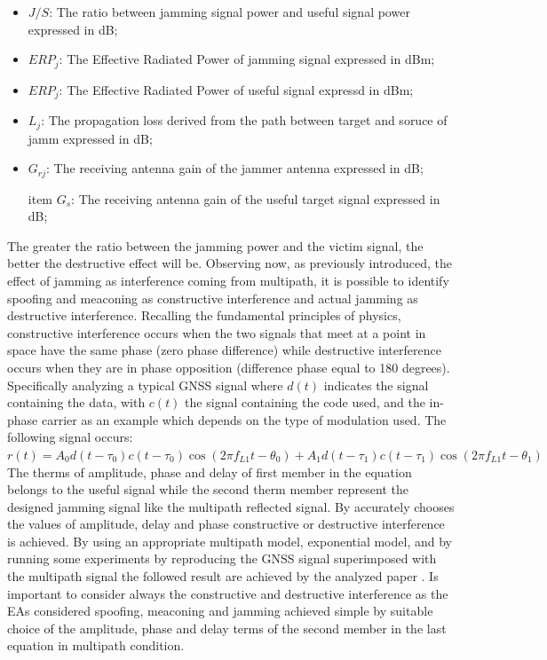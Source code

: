 \documentclass[12pt]{report}
\begin{document}
\begin{itemize}
     \item $J/S$: The ratio between jamming signal power and useful signal power expressed in dB;
         
    \item $ERP_{j}$: The Effective Radiated Power of jamming signal expressed in dBm;
        
    \item $ERP_{j}$: The Effective Radiated Power of useful signal expressd in dBm;
         
    \item $L_{j}$: The propagation loss derived from the path between target and soruce of jamm expressed in dB;
        
    \item $G_{rj}$: The receiving antenna gain of the jammer antenna expressed in dB;
           
    item $G_{s}$:  The receiving antenna gain of the useful target signal expressed in dB;
               
\end{itemize}
The greater the ratio between the jamming power and the victim signal, the better the destructive effect will be. Observing now, as previously introduced, the effect of jamming as interference coming from multipath, it is possible to identify spoofing and meaconing as constructive interference and actual jamming as destructive interference. Recalling the fundamental principles of physics, constructive interference occurs when the two signals that meet at a point in space have the same phase (zero phase difference) while destructive interference occurs when they are in phase opposition (difference phase equal to 180 degrees). Specifically analyzing a typical GNSS signal where $d(t)$ indicates the signal containing the data, with $c(t)$ the signal containing the code used, and the in-phase carrier as an example which depends on the type of modulation used. The following signal occurs: \newline \newline
$r(t) = A_{0} d(t - \tau_{0}) c(t - \tau_{0}) \cos({2\pi f_{L1}t - \theta_{0}}) + A_{1} d(t - \tau_{1}) c(t - \tau_{1}) \cos({2\pi f_{L1}t - \theta_{1}})$ \newline \newline
The therms of amplitude, phase and delay of first member in the equation belongs to the useful signal while the second therm member represent the designed jamming signal like the multipath reflected signal. By accurately chooses the values of amplitude, delay and phase constructive or destructive interference is achieved. By using an appropriate multipath model, exponential model, and by running some experiments by reproducing the GNSS signal superimposed with the multipath signal the followed result are achieved by the analyzed paper \cite{gnssgbasattack}.
Is important to consider always the constructive and destructive interference as the EAs considered spoofing, meaconing and jamming achieved simple by suitable choice of the amplitude, phase and delay terms of the second member in the last equation in multipath condition.
\end{document}
